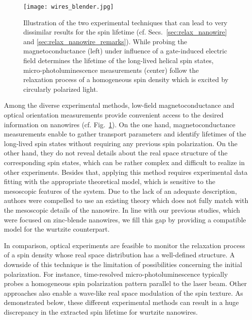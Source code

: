 \documentclass[superscriptaddress,noshowpacs,noshowkeys, twocolumn, floatfix,aps, prb,reprint]{revtex4-1}
\begin{document}
%
\begin{figure}[b]
\texttt{[image: wires\_blender.jpg]}
\caption{Illustration of the two experimental techniques that can lead to very dissimilar results for the spin lifetime (cf. Secs.~\ref{sec:relax_nanowire} and \ref{sec:relax_nanowire_remarks}).  
While probing the magnetoconductance (left) under influence of a gate-induced electric field determines the lifetime of the long-lived helical spin states, micro-photoluminescence measurements\cite{Furthmeier2016} (center) follow the relaxation process of a homogeneous spin density which is excited by circularly polarized light.}
\label{fig:exp_methods}
\end{figure}

Among the diverse experimental methods, low-field magnetoconductance and optical orientation measurements provide convenient access to the desired information on nanowires (cf. Fig.~\ref{fig:exp_methods}).
On the one hand, magnetoconductance measurements enable to  gather transport parameters and identify lifetimes of the long-lived spin states without requiring any previous spin polarization.
On the other hand, they do not reveal details about the real space structure of the corresponding spin states, which can be rather complex and difficult to realize in other experiments.
Besides that, applying this method requires experimental data fitting with the appropriate theoretical model, which is sensitive to the mesoscopic features of the system.
Due to the lack of an adequate description, authors were compelled to use an existing theory which does not fully match with the mesoscopic details of the nanowire.\cite{Hansen2005,Dhara2009,XiaoJie2010,Weperen2015,
Roulleau2010,Liang2012,Scheruebl2016,Takase2017,Jespersen2018}
In line with our previous studies,\cite{Kammermeier2016,Kammermeier2017} which were focused on zinc-blende nanowires, we fill this gap by providing a compatible model for the wurtzite counterpart.

In comparison, optical experiments are feasible to monitor the relaxation process of a spin density whose real space distribution has a well-defined structure.
A downside of this technique is the limitation of possibilities concerning the initial polarization.
For instance, time-resolved micro-photoluminescence typically probes a homogeneous spin polarization pattern parallel to the laser beam.\cite{Furthmeier2016}
Other approaches also enable a wave-like real space modulation of the spin texture.\cite{Carter2006,Koralek2009,Wang2013b}
As demonstrated below, these different experimental methods can result in a  huge discrepancy in the extracted spin lifetime for wurtzite nanowires.%
\end{document}
